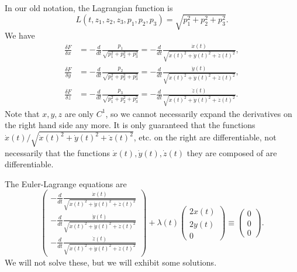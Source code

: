 \documentclass[11pt]{book}
\begin{document}
\begin{enumerate}
In our old notation, the Lagrangian function is
\[
L(t, z_1,z_2,z_3, p_1,p_2,p_3) = \sqrt{p_1^2 + p_2^2 + p_3^2}.
\]
We have
\begin{align*}
\frac{\delta F}{\delta x} &= -\frac{d}{dt} \frac{p_1}{\sqrt{p_1^2 + p_2^2 + p_3^2}} = -\frac{d}{dt} \frac{\dot{x}(t)}{\sqrt{\dot{x}(t)^2 + \dot{y}(t)^2 + \dot{z}(t)^2}}, \\
\frac{\delta F}{\delta y} &= -\frac{d}{dt} \frac{p_2}{\sqrt{p_1^2 + p_2^2 + p_3^2}} = -\frac{d}{dt} \frac{\dot{y}(t)}{\sqrt{\dot{x}(t)^2 + \dot{y}(t)^2 + \dot{z}(t)^2}}, \\ 
\frac{\delta F}{\delta z} &= -\frac{d}{dt} \frac{p_3}{\sqrt{p_1^2 + p_2^2 + p_3^2}} =  -\frac{d}{dt} \frac{\dot{z}(t)}{\sqrt{\dot{x}(t)^2 + \dot{y}(t)^2 + \dot{z}(t)^2}}.
\end{align*}
Note that $x,y,z$ are only $C^1$, so we cannot necessarily expand the derivatives on the right hand side any more. It is only guaranteed that the functions $\dot{x}(t) / \sqrt{\dot{x}(t)^2 + \dot{y}(t)^2 + \dot{z}(t)^2}$, etc. on the right are differentiable, not necessarily that the functions $\dot{x}(t), \dot{y}(t), \dot{z}(t)$ they are composed of are differentiable.

The Euler-Lagrange equations are
\[
\begin{pmatrix}
-\frac{d}{dt} \frac{\dot{x}(t)}{\sqrt{\dot{x}(t)^2 + \dot{y}(t)^2 + \dot{z}(t)^2}} \\
-\frac{d}{dt} \frac{\dot{y}(t)}{\sqrt{\dot{x}(t)^2 + \dot{y}(t)^2 + \dot{z}(t)^2}} \\
-\frac{d}{dt} \frac{\dot{z}(t)}{\sqrt{\dot{x}(t)^2 + \dot{y}(t)^2 + \dot{z}(t)^2}}
\end{pmatrix} + \lambda(t) \begin{pmatrix}
2x(t) \\ 2y(t) \\ 0
\end{pmatrix} \equiv \begin{pmatrix}
0 \\ 0 \\ 0
\end{pmatrix}.
\]
We will not solve these, but we will exhibit some solutions.


\end{enumerate}
\end{document}
